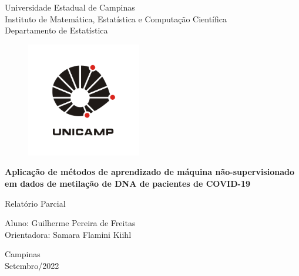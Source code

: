 \begin{titlepage}
    \begin{center}
        \vspace*{1cm}
        
        \LARGE
        Universidade Estadual de Campinas\\
        
        \large
        Instituto de Matemática, Estatística e Computação Científica\\
        Departamento de Estatística
        
        \vspace{0.5cm}

            
        \begin{figure}
		    \centering
		    \includegraphics[width=5cm]{unicamp-logo-0.png}\\
	    \end{figure}   
        
        \vspace{0.5cm}
        
        \Large
        \textbf{Aplicação de métodos de aprendizado de máquina não-supervisionado em dados de metilação de DNA de pacientes de COVID-19}
        
        \vspace{0.5cm}
        
        \large
        Relatório Parcial
        
        \vspace{2cm}
        
        \Large
        Aluno: Guilherme Pereira de Freitas\\
        Orientadora: Samara Flamini Kiihl
        
            
        \vfill
        
        \small
        Campinas\\
        Setembro/2022
            
        \vspace{0.8cm}
            

            
    \end{center}
\end{titlepage}
